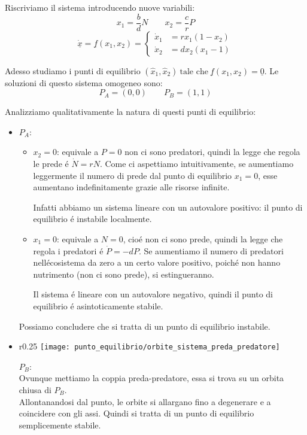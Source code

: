 \documentclass[../main.tex]{subfiles}
\begin{document}
		Riscriviamo il sistema introducendo nuove variabili:
		\[ x_1 = \frac{b}{d} N \qquad x_2 = \frac{c}{r} P \]
		\[
			\dot{\underline x} = \underline f(x_1, x_2) = 
			\begin{cases}
				\dot x_1 &= r x_1 (1-x_2)\\
				\dot x_2 &= d x_2 (x_1 - 1)
			\end{cases}
		\]
		
		Adesso studiamo i punti di equilibrio $ (\hat x_1, \hat x_2)\ \text{tale che}\ \underline f(x_1, x_2) = \underline 0 $. Le soluzioni di questo sistema omogeneo sono:
		\[ P_A = (0,0) \qquad P_B = (1,1) \]
		
		Analizziamo qualitativamente la natura di questi punti di equilibrio:
		\begin{itemize}
			\item
				$ P_A $:\\
				\begin{itemize}
					\item 
						$ x_2 = 0 $: equivale a $ P = 0 $ non ci sono predatori, quindi la legge che regola le prede \'e $ \dot N = rN $. Come ci aspettiamo intuitivamente, se aumentiamo leggermente il numero di prede dal punto di equilibrio $ x_1 = 0 $, esse aumentano indefinitamente grazie alle risorse infinite.
						
						Infatti abbiamo un sistema lineare con un autovalore positivo: il punto di equilibrio \'e instabile localmente.
					\item
						$ x_1 = 0 $: equivale a $ N = 0 $, cio\'e non ci sono prede, quindi la legge che regola i predatori \'e $ \dot P = -dP $. Se aumentiamo il numero di predatori nell\'ecosistema da zero a un certo valore positivo, poich\'e non hanno nutrimento (non ci sono prede), si estingueranno.
						
						Il sistema \'e lineare con un autovalore negativo, quindi il punto di equilibrio \'e asintoticamente stabile.
				\end{itemize}
				Possiamo concludere che si tratta di un punto di equilibrio instabile.
			\item
				\parbox[t]{\dimexpr\textwidth-\leftmargin}{
					\vspace{-2.5mm}
					\begin{wrapfigure}[10]{r}{0.25\textwidth}
						\centering
						\vspace{-\baselineskip}
						\texttt{[image: punto\_equilibrio/orbite\_sistema\_preda\_predatore]}
					\end{wrapfigure}
					$ P_B $:\\
					Ovunque mettiamo la coppia preda-predatore, essa si trova su un orbita chiusa di $ P_B $.\\
					Allontanandosi dal punto, le orbite si allargano fino a degenerare e a coincidere con gli assi. Quindi si tratta di un punto di equilibrio semplicemente stabile.
				}
		\end{itemize}
	
\end{document}
